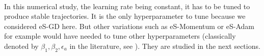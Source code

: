 \documentclass[article,authoryear,jmlmc]{beg_32}             %
\begin{document}


\ \\
In this numerical study, the learning rate being constant, it has to be tuned to produce stable trajectories. 
It is the only hyperparameter to tune because we considered eS-GD here. 
But other variations such as eS-Momentum or eS-Adam for example would have needed to tune other hyperparameters (classically denoted by $\beta_1,\beta_2, \epsilon_a$ in the literature, see
\cite{Bilel_thesis}). They are studied in the next sections. %
\end{document}
